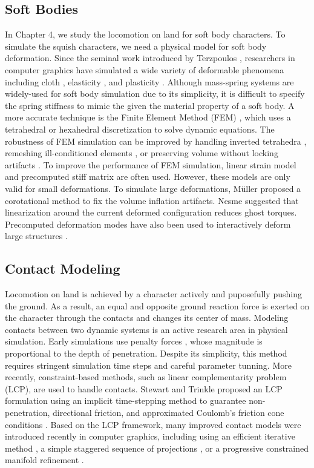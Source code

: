 \subsection{Soft Bodies}
In Chapter 4, we study the locomotion on land for soft body characters. To simulate the squish characters, we need a physical model for soft body deformation.
Since the seminal work introduced by Terzpoulos
\cite{Terzopoulos:1987}, researchers in computer graphics have
simulated a wide variety of deformable phenomena including cloth
\cite{Baraff:1998,Bridson:2002}, elasticity \cite{Muller:2002}, and
plasticity \cite{O'Brien:1999,Bargteil:2007}. Although mass-spring systems \cite{} are
widely-used for soft body simulation due to its simplicity, it is difficult to
specify the spring stiffness to mimic the given the material property of a soft body. A more accurate technique is
the Finite Element Method (FEM) \cite{Bathe:2007}, which uses a
tetrahedral or hexahedral discretization to solve dynamic
equations. The robustness of FEM simulation can be improved by
handling inverted tetrahedra \cite{Irving:2004}, remeshing
ill-conditioned elements \cite{Bargteil:2007}, or preserving volume
without locking artifacts \cite{Irving:2007}. To improve the
performance of FEM simulation, linear strain model and precomputed
stiff matrix are often used. However, these models are only valid for
small deformations. To simulate large deformations, M\"{u}ller \etal
\cite{Muller:2002} proposed a corotational method to fix the
volume inflation artifacts. Nesme \etal \cite{NPF05} suggested
that linearization around the current deformed configuration reduces
ghost torques. Precomputed deformation modes have also been used to
interactively deform large structures
\cite{James:2003,Barbic:2005,Kim:2009}.

\subsection{Contact Modeling}
Locomotion on land is achieved by a character actively and puposefully pushing the ground. As a result, an equal and opposite ground reaction force is exerted on the character through the contacts and changes its center of mass. Modeling contacts between two dynamic systems is an active research area in physical simulation. Early simulations use penalty forces \cite{}, whose magnitude is proportional to the depth of penetration. Despite its simplicity, this method requires stringent simulation time steps and careful parameter tunning. More recently, constraint-based methods, such as linear complementarity problem (LCP), are used to handle contacts. Stewart and Trinkle proposed an
LCP formulation using an implicit time-stepping method to guarantee
non-penetration, directional friction, and approximated Coulomb's
friction cone conditions \cite{Stewart:1996}. Based on the LCP
framework, many improved contact models were introduced recently in
computer graphics, including using an efficient iterative method
\cite{Erleben:2007}, a simple staggered sequence of projections
\cite{Kaufman:2008}, or a progressive constrained manifold
refinement \cite{Otaduy:2009}. 

